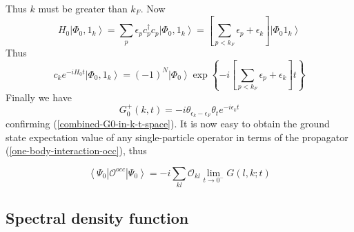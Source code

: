 Thus $k$ must be greater than $k_F$. Now
\begin{equation}H_{0}\left|\Phi_{0}, 1_{k}\right\rangle=\sum_{p} \epsilon_{p} c_{p}^{\dagger} c_{p}\left|\Phi_{0}, 1_{k}\right\rangle=\left[\sum_{p<k_{F}} \epsilon_{p}+\epsilon_{k}\right]\left|\Phi_{0} 1_{k}\right\rangle\end{equation}
Thus
\begin{equation}c_{k} e^{-i H_{0} t}\left|\Phi_{0}, 1_{k}\right\rangle=(-1)^{N}\left|\Phi_{0}\right\rangle \exp \left\{-i\left[\sum_{p<k_{F}} \epsilon_{p}+\epsilon_{k}\right] t\right\}\end{equation}
Finally we have
\begin{equation}G_{0}^{+}(k, t)=-i \theta_{\epsilon_k-\epsilon_F} \theta_{t} e^{-i \epsilon_k t}\end{equation}
confirming (\ref{combined-G0-in-k-t-space}). It is now easy to obtain the ground state expectation value of any single-particle operator in terms of the propagator (\ref{one-body-interaction-occ}), thus
\begin{imp}
\begin{equation}\left\langle\Psi_{0}\left|\mathcal{O}^{o c c}\right| \Psi_{0}\right\rangle=-i \sum_{k l} \mathcal{O}_{k l} \lim _{t \rightarrow 0^{-}} G(l, k ; t)\end{equation}
\end{imp}
\subsection{Spectral density function}